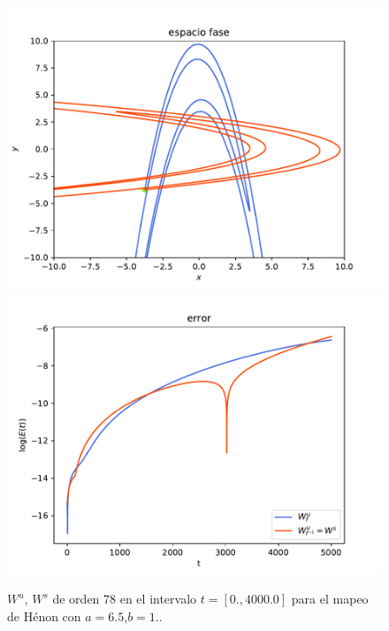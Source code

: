 \documentclass[11pt]{beamer}
\theoremstyle{definition}
\begin{document}
\begin{frame}
\begin{figure}
	\centering
	\includegraphics[scale=0.35]{h65}
		\includegraphics[scale=0.35]{errorH65}
	\caption{$W^{u}$, $W^{s}$ de orden $78$ en el intervalo $t=[0.,4000.0]$ para el mapeo de Hénon con $a=6.5$,$b=1.$.}
	\label{Henon3}
\end{figure}

\end{frame}
\end{document}
